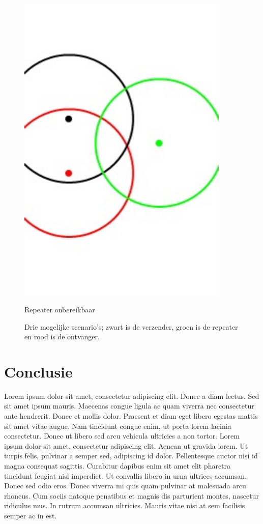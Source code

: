 \documentclass[a4paper,10pt]{article}
\begin{document}
\begin{figure}[ht!]
\begin{minipage}{\textwidth}
\begin{minipage}{0.3\textwidth}
            \includegraphics[width=0.9\textwidth]{drie.jpg}
            \caption*{Repeater onbereikbaar}
        \end{minipage}
	\caption{Drie mogelijke scenario's; zwart is de verzender, groen is de repeater en rood is de ontvanger.}
    \end{minipage}
\end{figure}

\section{Conclusie}
Lorem ipsum dolor sit amet, consectetur adipiscing elit. Donec a diam lectus. Sed sit amet ipsum mauris. Maecenas congue ligula ac quam viverra nec consectetur ante hendrerit. Donec et mollis dolor. Praesent et diam eget libero egestas mattis sit amet vitae augue. Nam tincidunt congue enim, ut porta lorem lacinia consectetur. Donec ut libero sed arcu vehicula ultricies a non tortor. Lorem ipsum dolor sit amet, consectetur adipiscing elit. Aenean ut gravida lorem. Ut turpis felis, pulvinar a semper sed, adipiscing id dolor. Pellentesque auctor nisi id magna consequat sagittis. Curabitur dapibus enim sit amet elit pharetra tincidunt feugiat nisl imperdiet. Ut convallis libero in urna ultrices accumsan. Donec sed odio eros. Donec viverra mi quis quam pulvinar at malesuada arcu rhoncus. Cum sociis natoque penatibus et magnis dis parturient montes, nascetur ridiculus mus. In rutrum accumsan ultricies. Mauris vitae nisi at sem facilisis semper ac in est.
\end{document}
